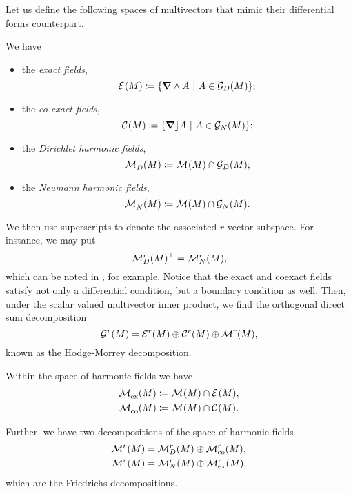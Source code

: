 Let us define the following spaces of multivectors that mimic their differential forms counterpart.
\begin{definition}
We have
\begin{itemize}
    \item the \emph{exact fields},
    \begin{equation}
        \mathcal{E}^{}(M)\coloneqq \{\boldsymbol{\nabla} \wedge A ~\vert~ A \in \mathcal{G}_D(M)\};
    \end{equation}
    \item the \emph{co-exact fields},
    \begin{equation}
        \mathcal{C}^{}(M)\coloneqq \{\boldsymbol{\nabla} \rfloor A ~\vert~ A \in \mathcal{G}_N(M)\};
    \end{equation}
    \item the \emph{Dirichlet harmonic fields},
    \begin{equation}
        \mathcal{M}^{}_D(M)\coloneqq \mathcal{M}^{}(M) \cap \mathcal{G}_D(M);
    \end{equation}
    \item the \emph{Neumann harmonic fields},
    \begin{equation}
        \mathcal{M}^{}_N(M)\coloneqq \mathcal{M}^{}(M) \cap \mathcal{G}_N(M).
    \end{equation}
\end{itemize}
\end{definition}
We then use superscripts to denote the associated $r$-vector subspace. For instance, we may put
\begin{equation}
\mathcal{M}^{r}_D(M)^\perp = \mathcal{M}^{r}_N(M),
\end{equation}
which can be noted in \cite{belishev_dirichlet_2008}, for example. Notice that the exact and coexact fields satisfy not only a differential condition, but a boundary condition as well. Then, under the scalar valued multivector inner product, we find the orthogonal direct sum decomposition
\begin{equation}
\mathcal{G}^r(M) = \mathcal{E}^{r}(M) \oplus \mathcal{C}^{r}(M) \oplus \mathcal{M}^{r}(M),
\end{equation}
known as the Hodge-Morrey decomposition.
\begin{definition}
Within the space of harmonic fields we have
\begin{align}
    \mathcal{M}^{}_{\textrm{ex}}(M) &\coloneqq \mathcal{M}^{}(M)\cap \mathcal{E}^{}(M),\\
    \mathcal{M}^{}_{\textrm{co}}(M) &\coloneqq \mathcal{M}^{}(M) \cap \mathcal{C}^{}(M).
\end{align}
\end{definition}
Further, we have two decompositions of the space of harmonic fields 
\begin{align}
    \mathcal{M}^{r}(M) &= \mathcal{M}^{r}_D(M) \oplus \mathcal{M}^{r}_{\textrm{co}}(M), \\
    \mathcal{M}^{r}(M) &= \mathcal{M}^{r}_N(M) \oplus \mathcal{M}^{r}_{\textrm{ex}}(M),
\end{align}
which are the Friedrichs decompositions.

